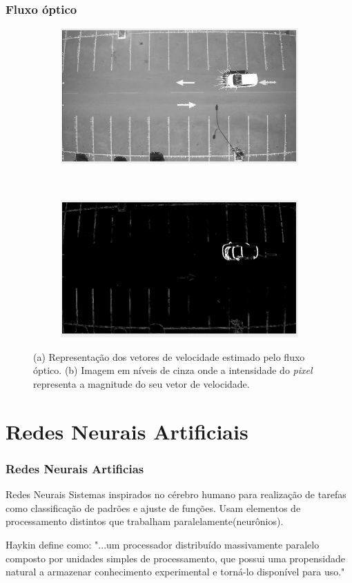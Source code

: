 \documentclass{beamer}
\begin{document}
\begin{frame}
\frametitle{Fluxo óptico}
\begin{figure}
 \centering
\begin{subfigure}{.4\textwidth}
  \centering
  \includegraphics[width=.8\linewidth]{velocidadevetores}
	\caption{}
\end{subfigure}\
\begin{subfigure}{.4\textwidth}
  \centering
  \includegraphics[width=.8\linewidth]{velocidademagnitude}
	\caption{}
\end{subfigure}
\caption{(a) Representação dos vetores de velocidade estimado pelo fluxo óptico. (b) Imagem em níveis de cinza onde a intensidade do \textit{pixel} representa a magnitude do seu vetor de velocidade.}
\end{figure}
\end{frame}

\section{Redes Neurais Artificiais}

\begin{frame}
\frametitle{Redes Neurais Artificias}
\begin{block}{Redes Neurais}
Sistemas inspirados no cérebro humano para realização de tarefas como classificação de padrões e ajuste de funções. Usam elementos de processamento distintos que trabalham paralelamente(neurônios).
\end{block}

\begin{block}{Haykin define como:}
 "...um processador distribuído massivamente paralelo composto por unidades simples de processamento, que possui uma propensidade natural a armazenar conhecimento experimental e torná-lo disponível para uso."
\end{block}
\end{frame}
\end{document}
